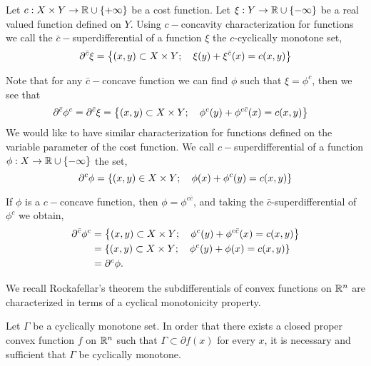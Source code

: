 \begin{definition}
Let $c:X\times Y \rightarrow \mathbb{R}\cup\left\lbrace +\infty \right\rbrace$ be a cost function. Let $\xi:Y\rightarrow \mathbb{R}\cup\left\lbrace -\infty \right\rbrace$ be a real valued function defined on $Y$. Using $c-$concavity characterization for functions we call the  $\bar c-$superdifferential of a function $\xi$ the $c$-cyclically monotone set,
\begin{equation}
	\partial^{\bar c} \xi=\left\lbrace (x,y)\subset X\times Y;\quad \xi(y)+\xi^{\bar{c}}(x)=c(x,y) \right\rbrace 
\end{equation}
\end{definition}
Note that for any $\bar c-$concave function we can find $\phi$ such that $\xi=\phi^{c}$, then we see that
\begin{align*}
	\partial^{\bar c}\phi^c=\partial^{\bar c}\xi &=\left\lbrace (x, y)\subset X\times Y;\quad \phi^{c}(y)+\phi^{c\bar c}(x)=c(x,y) \right\rbrace
\end{align*}
We would like to have similar characterization for functions defined on the variable parameter of the cost function. We call $c-$superdifferential of a function $\phi: X\rightarrow \mathbb{R} \cup\left\lbrace -\infty \right\rbrace$ the set,
\begin{equation*}
	\partial^{c}\phi=\left\lbrace (x,y)\in X\times Y;\quad \phi(x)+\phi^c(y)=c(x,y) \right\rbrace
\end{equation*}

If $\phi$ is a $c-$concave function, then $\phi=\phi^{c\bar c}$, and taking the $\bar c$-superdifferential of $\phi^{c}$ we obtain,
\begin{align*}
	\partial^{\bar c}\phi^c &=\left\lbrace (x, y)\subset X\times Y;\quad \phi^c(y)+\phi^{c\bar c}(x)=c(x,y) \right\rbrace\\
	&=\left\lbrace (x, y)\subset X\times Y;\quad \phi^c(y)+\phi(x)=c(x,y) \right\rbrace\\
	&=\partial^{c}\phi.
\end{align*}  

We recall Rockafellar's theorem the subdifferentials  of convex functions on $\mathbb{R}^n$ are characterized in terms of a cyclical monotonicity property.

\begin{theorem}[Rockafellar]
	\label{th: Rockafellar CM}
	Let $\Gamma$ be a cyclically monotone set. In order that there exists a closed proper convex function $f$ on $\mathbb{R}^n$ such that $\Gamma \subset \partial f(x) $ for  every $x$, it is necessary and sufficient that $\Gamma$ be cyclically monotone. 
\end{theorem}

